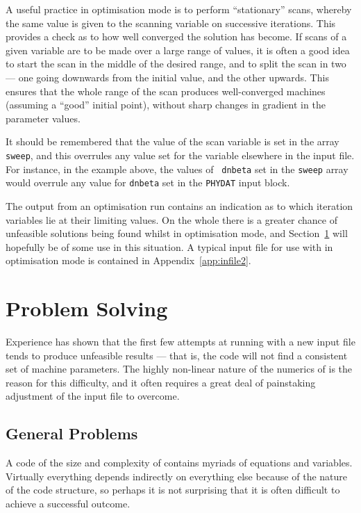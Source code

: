 A useful practice in optimisation mode is to perform ``stationary'' scans,
whereby the same value is given to the scanning variable on successive
iterations. This provides a check as to how well converged the solution has
become. If scans of a given variable are to be made over a large range of
values, it is often a good idea to start the scan in the middle of the desired
range, and to split the scan in two --- one going downwards from the initial
value, and the other upwards.  This ensures that the whole range of the scan
produces well-converged machines (assuming a ``good'' initial point), without
sharp changes in gradient in the parameter values.

It should be remembered that the value of the scan variable is set in the
array {\tt sweep}, and this overrules any value set for the variable elsewhere
in the input file. For instance, in the example above, the values of {\tt
dnbeta} set in the {\tt sweep} array would overrule any value for {\tt dnbeta}
set in the {\tt PHYDAT} input block.

The output from an optimisation run contains an indication as to which
iteration variables lie at their limiting values. On the whole there is a
greater chance of unfeasible solutions being found whilst in optimisation
mode, and Section~\ref{sec:problems} will hopefully be of some use in this
situation. A typical input file for use with \PS in optimisation mode is
contained in Appendix~\ref{app:infile2}.

\section{Problem Solving}
\label{sec:problems}

Experience has shown that the first few attempts at running \PS with a new
input file tends to produce unfeasible results --- that is, the code will not
find a consistent set of machine parameters. The highly non-linear nature of
the numerics of \PS is the reason for this difficulty, and it often requires a
great deal of painstaking adjustment of the input file to overcome.

\subsection{General Problems}

A code of the size and complexity of \PS contains myriads of equations and
variables. Virtually everything depends indirectly on everything else because
of the nature of the code structure, so perhaps it is not surprising that it
is often difficult to achieve a successful outcome.

